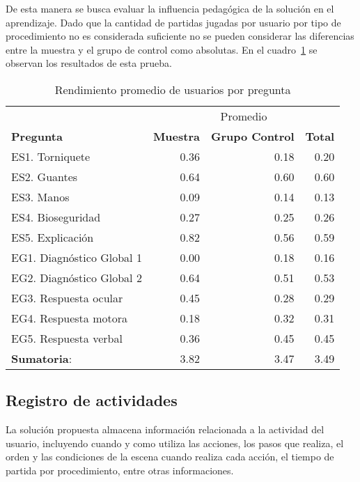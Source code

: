 De esta manera se busca evaluar la influencia pedagógica  de la solución en el
aprendizaje. Dado que la cantidad de partidas jugadas por usuario por tipo de
procedimiento no es considerada suficiente no se pueden considerar las
diferencias entre la muestra y el grupo de control como absolutas. En el
cuadro~\ref{tab:objetiva_rendimiento_por_pregunta} se observan los resultados de
esta prueba. %

\begin{table}[H]
\centering
\caption{Rendimiento promedio de usuarios por pregunta}
\begin{tabular}{lrrr}
\toprule
& \multicolumn{3}{c}{Promedio} \\
\cmidrule(lr){2-4}
\textbf{Pregunta} & 
\textbf{Muestra} & 
\textbf{Grupo Control} & 
\textbf{Total} \\ 
\midrule
ES1. Torniquete           & 0.36 & 0.18 & 0.20 \\
ES2. Guantes              & 0.64 & 0.60 & 0.60 \\
ES3. Manos                & 0.09 & 0.14 & 0.13 \\
ES4. Bioseguridad         & 0.27 & 0.25 & 0.26 \\
ES5. Explicación          & 0.82 & 0.56 & 0.59 \\
\midrule
EG1. Diagnóstico Global 1 & 0.00 & 0.18 & 0.16 \\
EG2. Diagnóstico Global 2 & 0.64 & 0.51 & 0.53 \\
EG3. Respuesta ocular     & 0.45 & 0.28 & 0.29 \\
EG4. Respuesta motora     & 0.18 & 0.32 & 0.31 \\
EG5. Respuesta verbal     & 0.36 & 0.45 & 0.45 \\
\midrule
\textbf{Sumatoria}: & 3.82 & 3.47 & 3.49  \\
\bottomrule
\end{tabular}

\label{tab:objetiva_rendimiento_por_pregunta}
\end{table}

\subsection{Registro de actividades}

La solución propuesta almacena información relacionada a la actividad del
usuario, incluyendo cuando y como utiliza las acciones, los pasos que realiza,
el orden y las condiciones de la escena cuando realiza cada acción, el tiempo de
partida por procedimiento, entre otras informaciones.

